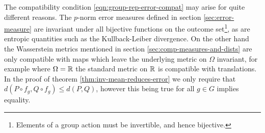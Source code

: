 The compatibility condition \eqref{eqn:group-rep-error-compat} may arise for quite different reasons. The $p$-norm error measures defined in section \ref{sec:error-measure} are invariant under all bijective functions on the outcome set\footnote{Elements of a group action must be invertible, and hence bijective.}, as are entropic quantities such as the Kullback-Leiber divergence. On the other hand the Wasserstein metrics mentioned in section \ref{sec:comp-measures-and-dists} are only compatible with maps which leave the underlying metric on $\Omega$ invariant, for example where $\Omega = \mathbb{R}$ the standard metric on $\mathbb{R}$ is compatible with translations. In the proof of theorem \ref{thm:inv-mean-reduces-error} we only require that $d(P\circ f_g, Q\circ f_g) \leq d(P,Q)$, however this being true for all $g\in G$ implies equality.

